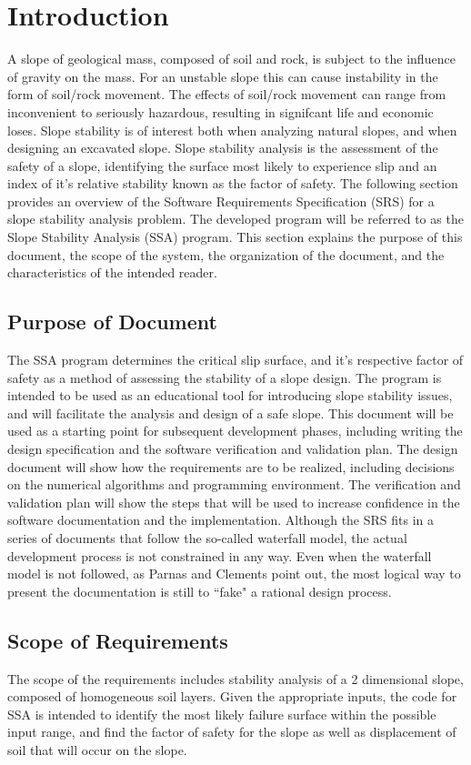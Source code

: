 \documentclass[12pt]{article}
\begin{document}
\section{Introduction}
\label{Sec:Intr}
A slope of geological mass, composed of soil and rock, is subject to the influence of gravity on the mass. For an unstable slope this can cause instability in the form of soil/rock movement. The effects of soil/rock movement can range from inconvenient to seriously hazardous, resulting in signifcant life and economic loses. Slope stability is of interest both when analyzing natural slopes, and when designing an excavated slope. Slope stability analysis is the assessment of the safety of a slope, identifying the surface most likely to experience slip and an index of it's relative stability known as the factor of safety.
The following section provides an overview of the Software Requirements Specification (SRS) for a slope stability analysis problem. The developed program will be referred to as the Slope Stability Analysis (SSA) program. This section explains the purpose of this document, the scope of the system, the organization of the document, and the characteristics of the intended reader.
\subsection{Purpose of Document}
\label{Sec:PurpofDocu}
The SSA program determines the critical slip surface, and it's respective factor of safety as a method of assessing the stability of a slope design. The program is intended to be used as an educational tool for introducing slope stability issues, and will facilitate the analysis and design of a safe slope.
This document will be used as a starting point for subsequent development phases, including writing the design specification and the software verification and validation plan. The design document will show how the requirements are to be realized, including decisions on the numerical algorithms and programming environment. The verification and validation plan will show the steps that will be used to increase confidence in the software documentation and the implementation. Although the SRS fits in a series of documents that follow the so-called waterfall model, the actual development process is not constrained in any way. Even when the waterfall model is not followed, as Parnas and Clements point out, the most logical way to present the documentation is still to ``fake" a rational design process.
\subsection{Scope of Requirements}
\label{Sec:ScopofRequ}
The scope of the requirements includes stability analysis of a 2 dimensional slope, composed of homogeneous soil layers. Given the appropriate inputs, the code for SSA is intended to identify the most likely failure surface within the possible input range, and find the factor of safety for the slope as well as displacement of soil that will occur on the slope.
\end{document}
